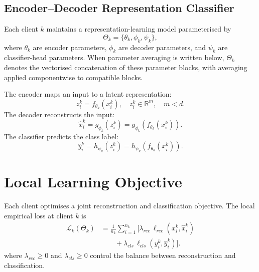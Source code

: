 \documentclass[conference]{IEEEtran}
\newcommand{\rev}[1]{{\color{red}#1}}
\begin{document}
\subsection{Encoder--Decoder Representation Classifier}
\label{subsec:encoder-decoder-representation-classifier}

Each client \(k\) maintains a representation-learning model parameterised by
\begin{equation}
    \Theta_k = \{\theta_k,\phi_k,\psi_k\},
    \label{eq:auto-007}
\end{equation}
where \(\theta_k\) are encoder parameters, \(\phi_k\) are decoder parameters, and \(\psi_k\) are classifier-head parameters. \rev{When parameter averaging is written below, \(\Theta_k\) denotes the vectorised concatenation of these parameter blocks, with averaging applied componentwise to compatible blocks.}

The encoder maps an input to a latent representation:
\begin{equation}
    z_i^k = f_{\theta_k}(x_i^k), \quad z_i^k \in \mathbb{R}^{m}, \quad m < d.
    \label{eq:auto-008}
\end{equation}
The decoder reconstructs the input:
\begin{equation}
    \hat{x}_i^k = g_{\phi_k}(z_i^k)=g_{\phi_k}(f_{\theta_k}(x_i^k)).
    \label{eq:auto-009}
\end{equation}
The classifier predicts the class label:
\begin{equation}
    \hat{y}_i^k = h_{\psi_k}(z_i^k)=h_{\psi_k}(f_{\theta_k}(x_i^k)).
    \label{eq:auto-010}
\end{equation}

\section{Local Learning Objective}
\label{sec:local-learning-objective}

Each client optimises a joint reconstruction and classification objective. The local empirical loss at client \(k\) is
\begin{equation}
\begin{aligned}
\mathcal{L}_k(\Theta_k)
&=\frac{1}{n_k}\sum_{i=1}^{n_k}
\Big[
\lambda_{rec}\,\ell_{rec}(x_i^k,\hat{x}_i^k)\\
&\qquad+\lambda_{cls}\,\ell_{cls}(y_i^k,\hat{y}_i^k)
\Big].
\end{aligned}
\label{eq:local_loss}
\end{equation}
where \(\lambda_{rec}\geq0\) and \(\lambda_{cls}\geq0\) control the balance between reconstruction and classification.
\end{document}
